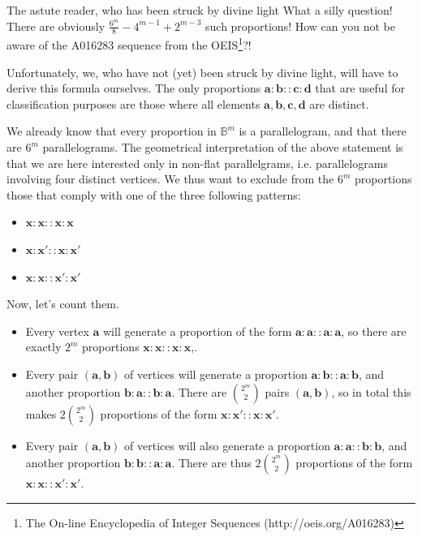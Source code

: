\begin{aquote}{The astute reader, who has been struck by divine light}
  What a silly question! There are obviously $\frac{6^m}{8} - 4^{m - 1} + 2^{m
  - 3}$ such proportions! How can you not be aware of the A016283 sequence from
  the OEIS\footnote{The On-line Encyclopedia of Integer Sequences
  (http://oeis.org/A016283)}?!
\end{aquote}

Unfortunately, we, who have not (yet) been struck by divine light, will have to
derive this formula ourselves. The only proportions
$\mathbf{a} : \mathbf{b} :: \mathbf{c} : \mathbf{d}$ that are useful for
classification purposes are those where all elements $\mathbf{a}, \mathbf{b},
\mathbf{c}, \mathbf{d}$ are distinct.

We already know that every proportion in $\mathbb{B}^m$ is a parallelogram, and
that there are $6^m$ parallelograms. The geometrical interpretation of the
above statement is that we are here interested only in non-flat parallelgrams,
i.e. parallelograms involving four distinct vertices. We thus want to exclude
from the $6^m$ proportions those that comply with one of the three following
patterns:

\begin{itemize}
  \item $\mathbf{x}: \mathbf{x} :: \mathbf{x} : \mathbf{x}$
  \item $\mathbf{x}: \mathbf{x'} :: \mathbf{x} : \mathbf{x'}$
  \item $\mathbf{x}: \mathbf{x} :: \mathbf{x'} : \mathbf{x'}$
\end{itemize}

Now, let's count them.

\begin{itemize}
  \item Every vertex $\mathbf{a}$ will generate a proportion of the form
    $\mathbf{a}: \mathbf{a} :: \mathbf{a} : \mathbf{a}$, so there are exactly
    $2^m$ proportions $\mathbf{x}: \mathbf{x} :: \mathbf{x} : \mathbf{x}$,.
  \item Every pair $(\mathbf{a}, \mathbf{b})$ of vertices will generate a
    proportion $\mathbf{a}: \mathbf{b} :: \mathbf{a} : \mathbf{b}$, and another
    proportion $\mathbf{b}: \mathbf{a} :: \mathbf{b} : \mathbf{a}$. There are
    $\binom{2^m}{2}$ pairs $(\mathbf{a}, \mathbf{b})$, so in total this makes
    $2\binom{2^m}{2}$ proportions of the form $\mathbf{x}: \mathbf{x'} ::
    \mathbf{x} : \mathbf{x'}$. 
  \item Every pair $(\mathbf{a}, \mathbf{b})$ of vertices will also generate a
    proportion $\mathbf{a}: \mathbf{a} :: \mathbf{b} : \mathbf{b}$, and another
    proportion $\mathbf{b}: \mathbf{b} :: \mathbf{a} : \mathbf{a}$. There are
    thus $2\binom{2^m}{2}$ proportions of the form $\mathbf{x}: \mathbf{x} ::
    \mathbf{x'} : \mathbf{x'}$.
\end{itemize}
